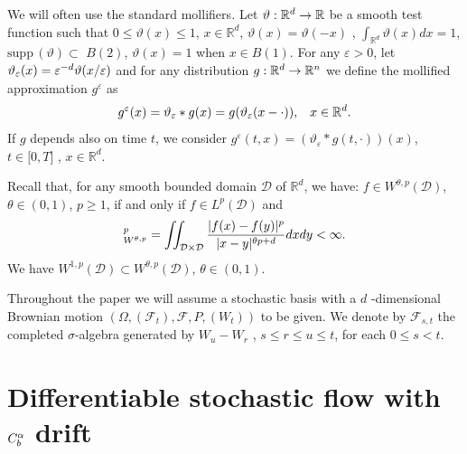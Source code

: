\documentclass[a4paper,11pt]{article}
\begin{document}
We will often use the standard mollifiers\textit{.} Let $\vartheta :{\mathbb{%
R}}^{d}\rightarrow {\mathbb{R}}$ be a smooth test function such that $0\leq
\vartheta (x)\leq 1$, $x\in {\mathbb{R}}^{d}$, $\vartheta (x)=\vartheta (-x)$%
, $\int_{{\mathbb{R}}^{d}}\vartheta (x)dx=1$, $\mathrm{supp}\,(\vartheta
)\subset $ $B(2)$, $\vartheta (x)=1$ when $x\in B(1)$. For any ${\varepsilon
}>0$, let $\vartheta _{{\varepsilon }}(x)={\varepsilon }^{-d}\vartheta (x/{%
\varepsilon })$ and for any distribution $g:{\mathbb{R}}^{d}\rightarrow {%
\mathbb{R}}^{n}$ we define the mollified approximation $g^{\varepsilon }$ as
\begin{equation}
g^{\varepsilon }(x)=\vartheta _{{\varepsilon }}\ast g(x)=g(\vartheta _{{%
\varepsilon }}(x-\cdot )),\;\;\;x\in {\mathbb{R}}^{d}.  \label{molli}
\end{equation}
If $g$ depends also on time $t$, we consider $g^{\varepsilon
}(t,x)=(\vartheta _{{\varepsilon }}\ast g(t,\cdot ))(x)$, $t\in \lbrack 0,T]$%
, $x\in \mathbb{R}^{d}$.




\medskip Recall that, for any smooth bounded domain $\mathcal{D}$ of $\mathbb{R}^d$,
we have: $f \in W^{\theta, p} (\mathcal  D)$, $\theta \in (0,1)$, $p \ge 1$, if and
only if $f \in L^p (\mathcal D)$ and
\begin{equation*}
[f]_{W^{\theta, p} }^p =\iint_{\mathcal D \times \mathcal D} \frac{|f(x) - f(y)|^p}{%
|x-y|^{\theta p + d}} dx dy < \infty.
\end{equation*}
We have $W^{1, p} (\mathcal D) \subset W^{\theta, p} (\mathcal D)$, $\theta \in (0,1)$.

\bigskip Throughout the paper we will assume a stochastic basis with a $d$%
-dimensional Brownian motion $\left( \Omega,\left( \mathcal{F}{}_{t}\right)
,{}\mathcal{F},P,\left( W_{t}\right) \right) $ to be given. We denote by $%
\mathcal{F}_{s,t}$ the completed $\sigma$-algebra generated by $W_{u}-W_{r}$%
, $s\leq r\leq u\leq t$, for each $0\le s<t$.

\section{Differentiable stochastic flow with $C_{b}^{{\protect\alpha }}$
drift}

\label{sec:ito}
\end{document}
